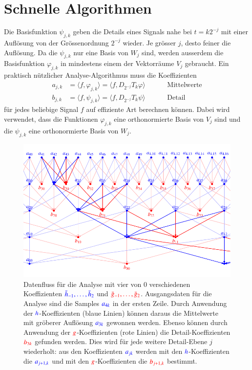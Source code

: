 %
%
%
\section{Schnelle Algorithmen
\label{section:fast}}
Die Basisfunktion $\psi_{j,k}$ geben die Details eines Signals nahe bei
$t=k2^{-j}$ mit einer Auflösung von der Grössenordnung $2^{-j}$ wieder.
Je grösser $j$, desto feiner die Auflösung.
Da die $\psi_{j,k}$ nur eine Basis von $W_j$ sind, werden ausserdem die
Basisfunktion $\varphi_{j,k}$ in mindestens einem der Vektorräume
$V_j$ gebraucht.
Ein praktisch nützlicher Analyse-Algorithmus muss die Koeffizienten
\[
\begin{aligned}
a_{j,k}
&=
\langle f, \varphi_{j,k}\rangle
=
\langle f, D_{2^{-j}}T_k\varphi \rangle
&&&&\text{Mittelwerte}
\\
b_{j,k}
&=
\langle f, \psi_{j,k}\rangle
=
\langle f, D_{2^{-j}}T_k\psi \rangle
&&&&\text{Detail}
\end{aligned}
\]
für jedes beliebige Signal $f$ auf effiziente Art berechnen können.
Dabei wird verwendet, dass die Funktionen  $\varphi_{j,k}$ eine
orthonormierte Basis von $V_j$ sind und die $\psi_{j,k}$ eine
orthonormierte Basis von $W_j$.

\begin{figure}
\centering
\includegraphics{chapters/7-algo/images/fastalgo.pdf}
\caption{Datenfluss für die Analyse mit vier von $0$ verschiedenen
Koeffizienten $\color{blue}\bar{h}_{-1},\dots,\bar{h}_2$ und
$\color{red}\bar{g}_{-1},\dots,\bar{g}_2$.
Ausgangsdaten für die Analyse sind die Samples $\color{blue}a_{4k}$
in der ersten Zeile.
Durch Anwendung der $\color{blue}h$-Koeffizienten (blaue Linien) können daraus
die Mittelwerte mit gröberer Auflösung $\color{blue}a_{3k}$ gewonnen werden.
Ebenso können durch Anwendung der $\color{red}g$-Koeffizienten (rote Linien)
die Detail-Koeffizienten $\color{red}b_{3k}$ gefunden werden.
Dies wird für jede weitere Detail-Ebene $j$ wiederholt: aus den Koeffizienten
$\color{blue}a_{jk}$ werden mit den $\color{blue}h$-Koeffizienten die
$\color{blue}a_{j+1,k}$ und mit den $\color{red}g$-Koeffizienten die
$\color{red}b_{j+1,k}$ bestimmt.
\label{algo:image:fastalgo}}
\end{figure}

